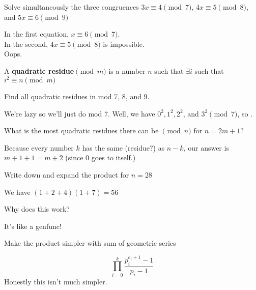 \documentclass[12pt]{scrartcl}
\begin{document}
\begin{exercise}
	Solve simultaneously the three congruences $3x \equiv 4 \pmod{7}$, $4x \equiv 5 \pmod{8}$, and $5x \equiv 6 \pmod {9}$
	\begin{soln}
		In the first equation, $x \equiv 6 \pmod{7}$. \\
		In the second, $4x \equiv 5 \pmod{8}$ is impossible.\\
		Oops.
	\end{soln}
\end{exercise}

\begin{definition*}
	A \textbf{quadratic residue}$\pmod{m}$ is a number $n$ such that $\exists i$ such that $i^2 \equiv n \pmod{m}$
\end{definition*}

\begin{exercise}
Find all quadratic residues in mod 7, 8, and 9.
	\begin{soln}
		We're lazy so we'll just do mod 7.
		Well, we have $0^2, 1^2, 2^2$, and $3^2 \pmod{7}$, so .
	\end{soln}
\end{exercise}

\begin{exercise}
	What is the most quadratic residues there can be $\pmod{n}$ for $n=2m+1$?
	\begin{soln}
		Because every number $k$ has the same (residue?) as $n - k$, our answer is $m+1 + 1 = \boxed{m+2}$ (since 0 goes to itself.)
	\end{soln}
\end{exercise}

\setcounter{exercise}{9}

\begin{exercise}
	Write down and expand the product for $n=28$
	\begin{soln}
		We have $(1 + 2 + 4)(1 + 7) = 56$
	\end{soln}
\end{exercise}

\begin{exercise}
	Why does this work?
	\begin{soln}
		It's like a genfunc!
	\end{soln}
\end{exercise}

\begin{exercise}
	Make the product simpler with sum of geometric series
	\begin{soln}
		\[\prod_{i = 0}^k \frac{p_i^{e_i + 1}-1}{p_i - 1}\]
		Honestly this isn't much simpler.
	\end{soln}
\end{exercise}
\end{document}
